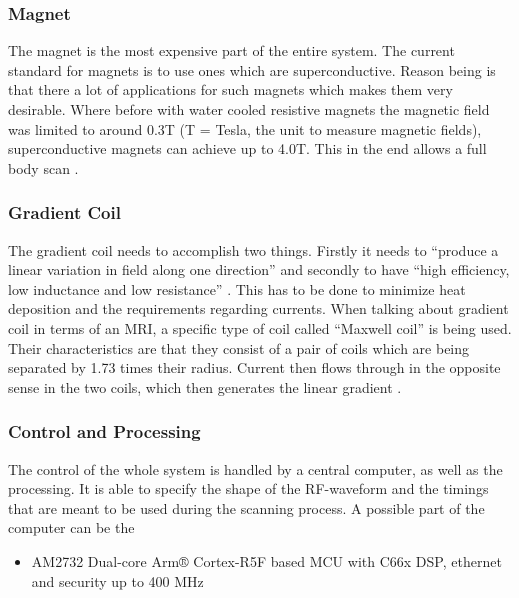 \documentclass[conference]{IEEEtran}
\begin{document}
    \subsubsection{Magnet}

        The magnet is the most expensive part of the entire system. The current standard for magnets is to use ones which are superconductive. Reason being is that there a lot of applications for such magnets which makes them very desirable. Where before with water cooled resistive magnets the magnetic field was limited to around 0.3T (T = Tesla, the unit to measure magnetic fields), superconductive magnets can achieve up to 4.0T. This in the end allows a full body scan \cite{fmrib}.

    \subsubsection{Gradient Coil}
    
        The gradient coil needs to accomplish two things. Firstly it needs to “produce a linear variation in field along one direction” \cite{fmrib} and secondly to have “high efficiency, low inductance and low resistance” \cite{fmrib}. This has to be done to minimize heat deposition and the requirements regarding currents.
        When talking about gradient coil in terms of an MRI, a specific type of coil called “Maxwell coil” is being used. Their characteristics are that they consist of a pair of coils which are being separated by 1.73 times their radius. Current then flows through in the opposite sense in the two coils, which then generates the linear gradient \cite{fmrib}.
    
    
    \subsubsection{Control and Processing}
    
        The control of the whole system is handled by a central computer, as well as the processing. It is able to specify the shape of the RF-waveform and the timings that are meant to be used during the scanning process. A possible part of the computer can be the
        
        \begin{itemize}
            \item AM2732 Dual-core Arm® Cortex-R5F based MCU with C66x DSP, ethernet and security up to 400 MHz \cite{AM2732}\cite{sheet}
        \end{itemize}    
\end{document}
